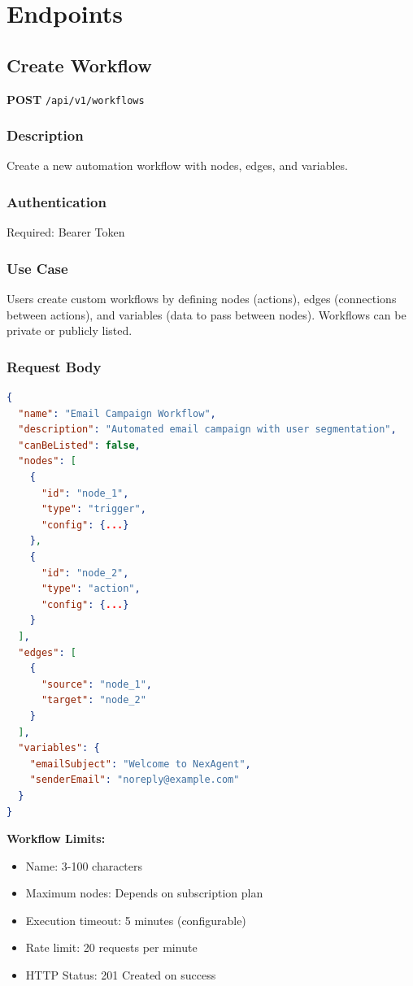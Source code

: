 \documentclass[11pt,a4paper]{report}
\begin{document}
\section{Endpoints}

\subsection{Create Workflow}

\textbf{POST} \texttt{/api/v1/workflows}

\subsubsection{Description}
Create a new automation workflow with nodes, edges, and variables.

\subsubsection{Authentication}
Required: Bearer Token

\subsubsection{Use Case}
Users create custom workflows by defining nodes (actions), edges (connections between actions), and variables (data to pass between nodes). Workflows can be private or publicly listed.

\subsubsection{Request Body}
\begin{lstlisting}[style=jsoncode,language=json]
{
  "name": "Email Campaign Workflow",
  "description": "Automated email campaign with user segmentation",
  "canBeListed": false,
  "nodes": [
    {
      "id": "node_1",
      "type": "trigger",
      "config": {...}
    },
    {
      "id": "node_2",
      "type": "action",
      "config": {...}
    }
  ],
  "edges": [
    {
      "source": "node_1",
      "target": "node_2"
    }
  ],
  "variables": {
    "emailSubject": "Welcome to NexAgent",
    "senderEmail": "noreply@example.com"
  }
}
\end{lstlisting}

\begin{infobox}
\textbf{Workflow Limits:}
\begin{itemize}[leftmargin=*]
    \item Name: 3-100 characters
    \item Maximum nodes: Depends on subscription plan
    \item Execution timeout: 5 minutes (configurable)
    \item Rate limit: 20 requests per minute
    \item HTTP Status: 201 Created on success
\end{itemize}
\end{infobox}
\end{document}
